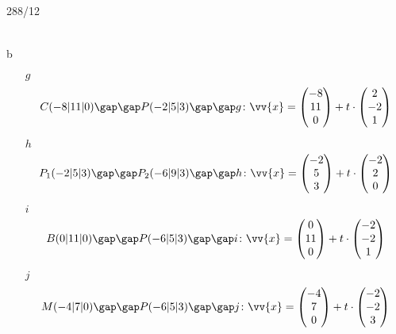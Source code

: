 \begin{exercise}{288/12}
\begin{itemize}
\begin{gather*}
    \end{gather*}
  \end{itemize}
  \item [b]
  \begin{itemize}
    \item [$g$]
    \begin{gather*}
      C(-8|11|0) \gap\gap P(-2|5|3) \gap\gap g \colon \vv{x} = \begin{pmatrix}-8 \\ 11 \\ 0\end{pmatrix} + t \cdot \begin{pmatrix}2 \\ -2 \\ 1\end{pmatrix}
    \end{gather*}
    \item [$h$]
    \begin{gather*}
      P_1(-2|5|3) \gap\gap P_2(-6|9|3) \gap\gap h \colon \vv{x} = \begin{pmatrix}-2 \\ 5 \\ 3\end{pmatrix} + t \cdot \begin{pmatrix}-2 \\ 2 \\ 0\end{pmatrix}
    \end{gather*}
    \item [$i$]
    \begin{gather*}
      B(0|11|0) \gap\gap P(-6|5|3) \gap\gap i \colon \vv{x} = \begin{pmatrix}0 \\ 11 \\ 0\end{pmatrix} + t \cdot \begin{pmatrix}-2 \\ -2 \\ 1\end{pmatrix}
    \end{gather*}
    \item [$j$]
    \begin{gather*}
      M(-4|7|0) \gap\gap P(-6|5|3) \gap\gap j \colon \vv{x} = \begin{pmatrix}-4 \\ 7 \\ 0\end{pmatrix} + t \cdot \begin{pmatrix}-2 \\ -2 \\ 3\end{pmatrix}
    \end{gather*}
  \end{itemize}
\end{exercise}
